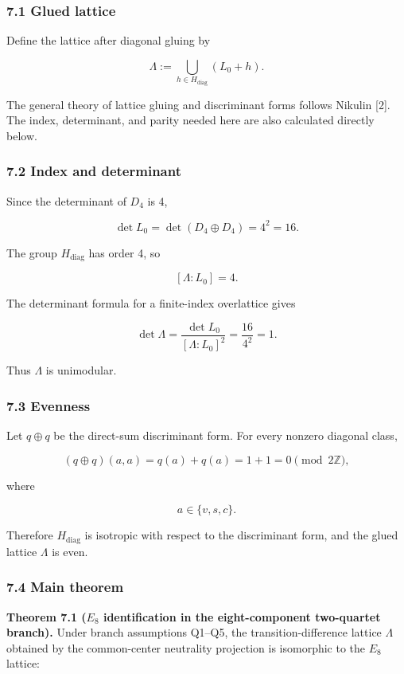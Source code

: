\documentclass[
  a4paper,
]{article}
\begin{document}
\subsubsection{7.1 Glued lattice}\label{glued-lattice}

Define the lattice after diagonal gluing by

\[
\Lambda
:=
\bigcup_{h\in H_{\mathrm{diag}}}
\left(
L_0+h
\right).
\]

The general theory of lattice gluing and discriminant forms follows
Nikulin {[}2{]}. The index, determinant, and parity needed here are also
calculated directly below.

\subsubsection{7.2 Index and determinant}\label{index-and-determinant}

Since the determinant of \(D_4\) is 4,

\[
\det L_0
=
\det(D_4\oplus D_4)
=
4^2
=16.
\]

The group \(H_{\mathrm{diag}}\) has order 4, so

\[
[\Lambda:L_0]
=4.
\]

The determinant formula for a finite-index overlattice gives

\[
\det\Lambda
=
\frac{\det L_0}
{[\Lambda:L_0]^2}
=
\frac{16}{4^2}
=1.
\]

Thus \(\Lambda\) is unimodular.

\subsubsection{7.3 Evenness}\label{evenness}

Let \(q\oplus q\) be the direct-sum discriminant form. For every nonzero
diagonal class,

\[
(q\oplus q)(a,a)
=
q(a)+q(a)
=
1+1
=0
\pmod{2\mathbb Z},
\]

where

\[
a\in\{v,s,c\}.
\]

Therefore \(H_{\mathrm{diag}}\) is isotropic with respect to the
discriminant form, and the glued lattice \(\Lambda\) is even.

\subsubsection{7.4 Main theorem}\label{main-theorem}

\textbf{Theorem 7.1 (\(E_8\) identification in the eight-component
two-quartet branch).} Under branch assumptions Q1--Q5, the
transition-difference lattice \(\Lambda\) obtained by the common-center
neutrality projection is isomorphic to the \(E_8\) lattice:
\end{document}
